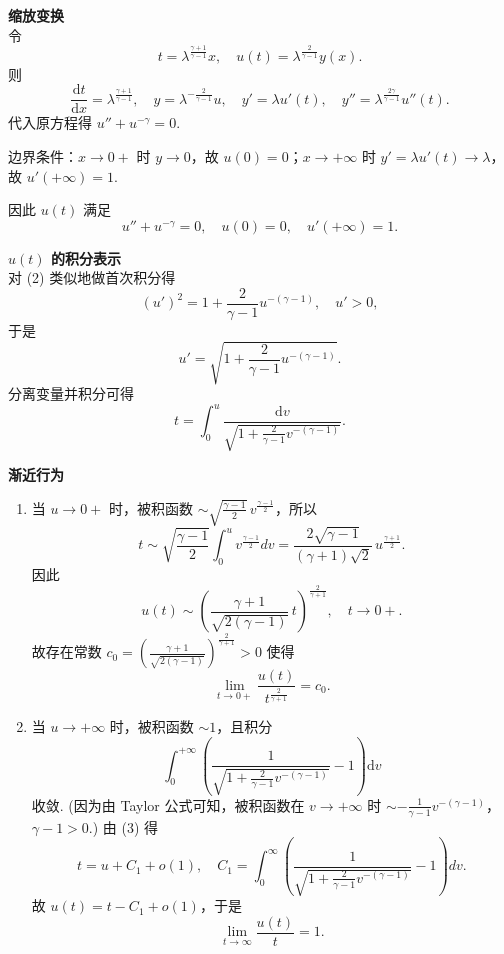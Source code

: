 \begin{enumerate}
\begin{solution}
        \textbf{缩放变换}\\
        令
        \[
        t = \lambda^{\frac{\gamma+1}{\gamma-1}} x, \quad u(t) = \lambda^{\frac{2}{\gamma-1}} y(x).
        \]
        则
        \[
        \frac{\mathrm{d}t}{\mathrm{d}x} = \lambda^{\frac{\gamma+1}{\gamma-1}},\quad y = \lambda^{-\frac{2}{\gamma-1}}u,\quad y' = \lambda u'(t),\quad y'' = \lambda^{\frac{2\gamma}{\gamma-1}} u''(t).
        \]
        代入原方程得 $u''+u^{-\gamma}=0$. 

        边界条件：$x\to0+$ 时 $y\to0$，故 $u(0)=0$；$x\to+\infty$ 时 $y'=\lambda u'(t)\to\lambda$，故 $u'(+\infty)=1$.
        
        因此 $u(t)$ 满足
        \[
        u''+u^{-\gamma}=0,\quad u(0)=0,\quad u'(+\infty)=1. \tag{2}
        \]

        \textbf{$u(t)$ 的积分表示}\\
        对 (2) 类似地做首次积分得
        \[
        (u')^2 = 1 + \frac{2}{\gamma-1} u^{-(\gamma-1)},\quad u'>0,
        \]
        于是
        \[
        u' = \sqrt{1 + \frac{2}{\gamma-1} u^{-(\gamma-1)}}.
        \]
        分离变量并积分可得
        \[
        t = \int_0^u \frac{\mathrm{d}v}{\sqrt{1+\frac{2}{\gamma-1}v^{-(\gamma-1)}}}. \tag{3}
        \]

        \textbf{渐近行为}\\
        \begin{enumerate}
        \item[i.] 当 $u\to0+$ 时，被积函数 $\displaystyle\sim \sqrt{\frac{\gamma-1}{2}}\,v^{\frac{\gamma-1}{2}}$，所以
        \[
        t \sim \sqrt{\frac{\gamma-1}{2}}\int_0^u v^{\frac{\gamma-1}{2}}dv = \frac{2\sqrt{\gamma-1}}{(\gamma+1)\sqrt{2}}\, u^{\frac{\gamma+1}{2}}.
        \]
        因此
        \[
        u(t) \sim \left(\frac{\gamma+1}{\sqrt{2(\gamma-1)}}\,t\right)^{\frac{2}{\gamma+1}},\quad t\to0+.
        \]
        故存在常数 $\displaystyle c_0 = \left(\frac{\gamma+1}{\sqrt{2(\gamma-1)}}\right)^{\frac{2}{\gamma+1}} >0$ 使得
        \[
        \lim_{t\to0+}\frac{u(t)}{t^{\frac{2}{\gamma+1}}} = c_0. \tag{4}
        \]

        \item[ii.] 当 $u\to+\infty$ 时，被积函数 $\sim 1$，且积分
        \[
        \int_0^{+\infty}\left(\frac{1}{\sqrt{1+\frac{2}{\gamma-1}v^{-(\gamma-1)}}}-1\right)\mathrm{d}v
        \]
        收敛. (因为由 Taylor 公式可知，被积函数在 $v\to+\infty$ 时 $\sim -\frac{1}{\gamma-1}v^{-(\gamma-1)}$，$\gamma-1>0$.)
        由 (3) 得
        \[
        t = u + C_1 + o(1),\quad C_1 = \int_0^\infty\left(\frac{1}{\sqrt{1+\frac{2}{\gamma-1}v^{-(\gamma-1)}}}-1\right)dv.
        \]
        故 $u(t) = t - C_1 + o(1)$，于是
        \[
        \lim_{t\to\infty}\frac{u(t)}{t} = 1. \tag{5}
        \]
        \end{enumerate}


\end{solution}
\end{enumerate}
